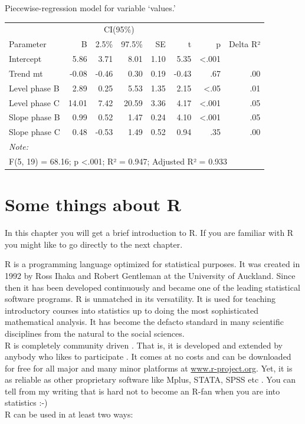 \documentclass[
]{book}
\begin{document}
Piecewise-regression model for variable `values.'

\begin{table}
\centering
\begin{tabular}{lrrrrrrr}
\toprule
\multicolumn{2}{c}{ } & \multicolumn{2}{c}{CI(95\%)} & \multicolumn{4}{c}{ } \\
\cmidrule(l{3pt}r{3pt}){3-4}
Parameter & B & 2.5\% & 97.5\% & SE & t & p & Delta R²\\
\midrule
Intercept & 5.86 & 3.71 & 8.01 & 1.10 & 5.35 & <.001 & \\
Trend mt & -0.08 & -0.46 & 0.30 & 0.19 & -0.43 & .67 & .00\\
Level phase B & 2.89 & 0.25 & 5.53 & 1.35 & 2.15 & <.05 & .01\\
Level phase C & 14.01 & 7.42 & 20.59 & 3.36 & 4.17 & <.001 & .05\\
Slope phase B & 0.99 & 0.52 & 1.47 & 0.24 & 4.10 & <.001 & .05\\
\addlinespace
Slope phase C & 0.48 & -0.53 & 1.49 & 0.52 & 0.94 & .35 & .00\\
\bottomrule
\multicolumn{8}{l}{\rule{0pt}{1em}\textit{Note: }}\\
\multicolumn{8}{l}{\rule{0pt}{1em}F(5, 19) = 68.16; p <.001; R² = 0.947; Adjusted R² = 0.933}\\
\end{tabular}
\end{table}

\hypertarget{some-things-about-r}{%
\chapter{Some things about R}\label{some-things-about-r}}

In this chapter you will get a brief introduction to R. If you are familiar with R you might like to go directly to the next chapter.

\hfill\break
R is a programming language optimized for statistical purposes. It was created in 1992 by Ross Ihaka and Robert Gentleman at the University of Auckland. Since then it has been developed continuously and became one of the leading statistical software programs. R is unmatched in its versatility. It is used for teaching introductory courses into statistics up to doing the most sophisticated mathematical analysis. It has become the defacto standard in many scientific disciplines from the natural to the social sciences.\\
R is completely community driven . That is, it is developed and extended by anybody who likes to participate . It comes at no costs and can be downloaded for free for all major and many minor platforms at \href{http://www.r-project.org}{www.r-project.org}. Yet, it is as reliable as other proprietary software like Mplus, STATA, SPSS etc . You can tell from my writing that is hard not to become an R-fan when you are into statistics :-)\\
R can be used in at least two ways:
\end{document}
